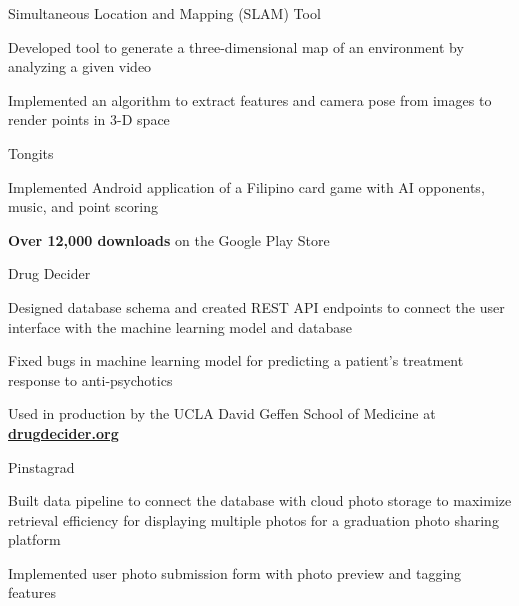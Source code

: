 \documentclass[12pt, letterpaper]{awesome-cv}
\begin{document}
\begin{cventries}
  \cventry
    {} %
    {Simultaneous Location and Mapping (SLAM) Tool} %
    {} %
    {} %
    {
      \vspace{-0.2in}
      \begin{cvitems} %
        \item {Developed tool to generate a three-dimensional map of an environment by analyzing a given video}
		    \item {Implemented an algorithm to extract features and camera pose from images to render points in 3-D space}
      \end{cvitems}
    }

  \cventry
    {} %
    {Tongits} %
    {} %
    {} %
    {
      \vspace{-0.2in}
      \begin{cvitems} %
      	\item {Implemented Android application of a Filipino card game with AI opponents, music, and point scoring}
		    \item 
            \textbf{Over 12,000 downloads} on the Google Play Store
      \end{cvitems}
    }

  \cventry
    {} %
    {Drug Decider} %
    {} %
    {} %
    {
      \vspace{-0.2in}
      \begin{cvitems} %
      	\item {Designed database schema and created REST API endpoints to connect the user interface with the machine learning model and database}
		    \item {Fixed bugs in machine learning model for predicting a patient’s treatment response to anti-psychotics}
        \item
            Used in production by the UCLA David Geffen School of Medicine at \href{https://drugdecider.org}{\textbf{drugdecider.org}}
      \end{cvitems}
    }

  \cventry
    {}
    {Pinstagrad}
    {}
    {}
    {
      \vspace{-0.2in}
      \begin{cvitems} %
      	\item {Built data pipeline to connect the database with cloud photo storage to maximize retrieval efficiency for displaying multiple photos for a graduation photo sharing platform}
		    \item {Implemented user photo submission form with photo preview and tagging features}
      \end{cvitems}
    }
\end{cventries}
\end{document}
